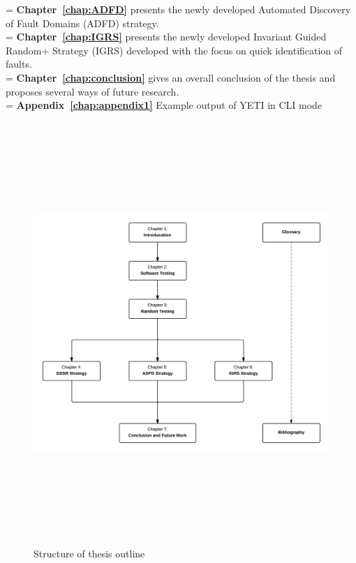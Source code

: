\hangindent=\parindent
{}
\noindent
\textbf{Chapter~\ref{chap:ADFD}} presents the newly developed Automated Discovery of Fault Domains  (ADFD) strategy. \\

 
\hangindent=\parindent
{}
\noindent
\textbf{Chapter~\ref{chap:IGRS}} presents the newly developed Invariant Guided Random+ Strategy (IGRS) developed with the focus on quick identification of faults. \\

\hangindent=\parindent
{}
\noindent
\textbf{Chapter~\ref{chap:conclusion}} gives an overall conclusion of the thesis and proposes several ways of future research. \\

 \hangindent=\parindent
 \noindent
 \textbf{Appendix~\ref{chap:appendix1}} Example output of YETI in CLI mode\\

\begin{figure}[h]
	\centering
		\includegraphics[width=15cm, height=16cm ]{chapter1/thesisOutline.png}
		\caption{Structure of thesis outline}
	\label{fig:thesisOutline}
\end{figure}



